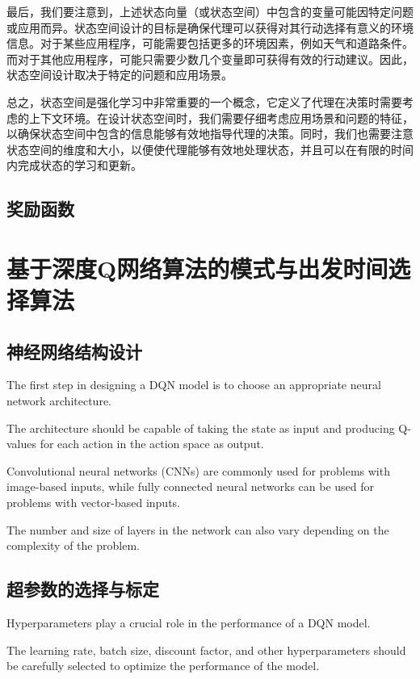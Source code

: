 最后，我们要注意到，上述状态向量（或状态空间）中包含的变量可能因特定问题或应用而异。状态空间设计的目标是确保代理可以获得对其行动选择有意义的环境信息。对于某些应用程序，可能需要包括更多的环境因素，例如天气和道路条件。而对于其他应用程序，可能只需要少数几个变量即可获得有效的行动建议。因此，状态空间设计取决于特定的问题和应用场景。

总之，状态空间是强化学习中非常重要的一个概念，它定义了代理在决策时需要考虑的上下文环境。在设计状态空间时，我们需要仔细考虑应用场景和问题的特征，以确保状态空间中包含的信息能够有效地指导代理的决策。同时，我们也需要注意状态空间的维度和大小，以便使代理能够有效地处理状态，并且可以在有限的时间内完成状态的学习和更新。
\subsection{奖励函数}

\section{基于深度Q网络算法的模式与出发时间选择算法}

\subsection{神经网络结构设计}

The first step in designing a DQN model is to choose an appropriate neural network architecture.

The architecture should be capable of taking the state as input and producing Q-values for each action in the action space as output.

Convolutional neural networks (CNNs) are commonly used for problems with image-based inputs, while fully connected neural networks can be used for problems with vector-based inputs.

The number and size of layers in the network can also vary depending on the complexity of the problem.

\subsection{超参数的选择与标定}

Hyperparameters play a crucial role in the performance of a DQN model.

The learning rate, batch size, discount factor, and other hyperparameters should be carefully selected to optimize the performance of the model.

